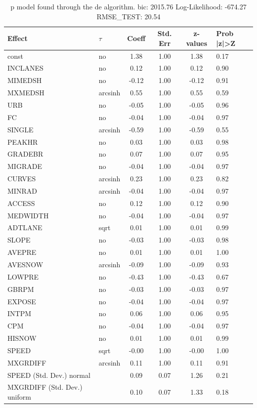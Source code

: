 \begin{table}
	\caption{p model found through the de algorithm. bic: 2015.76 Log-Likelihood: -674.27 RMSE_TEST: 20.54}
	\begin{center}
		\begin{tabular}{|l|l|c|c|c|l|}
			\hline
			Effect & $\tau$ & Coeff & Std. Err & z-values & Prob |z|>Z \\
			\hline
			const & no & 1.38 & 1.00 & 1.38 & 0.17 \\
			\hline
			INCLANES & no & 0.12 & 1.00 & 0.12 & 0.90 \\
			\hline
			MIMEDSH & no & -0.12 & 1.00 & -0.12 & 0.91 \\
			\hline
			MXMEDSH & arcsinh & 0.55 & 1.00 & 0.55 & 0.59 \\
			\hline
			URB & no & -0.05 & 1.00 & -0.05 & 0.96 \\
			\hline
			FC & no & -0.04 & 1.00 & -0.04 & 0.97 \\
			\hline
			SINGLE & arcsinh & -0.59 & 1.00 & -0.59 & 0.55 \\
			\hline
			PEAKHR & no & 0.03 & 1.00 & 0.03 & 0.98 \\
			\hline
			GRADEBR & no & 0.07 & 1.00 & 0.07 & 0.95 \\
			\hline
			MIGRADE & no & -0.04 & 1.00 & -0.04 & 0.97 \\
			\hline
			CURVES & arcsinh & 0.23 & 1.00 & 0.23 & 0.82 \\
			\hline
			MINRAD & arcsinh & -0.04 & 1.00 & -0.04 & 0.97 \\
			\hline
			ACCESS & no & 0.12 & 1.00 & 0.12 & 0.90 \\
			\hline
			MEDWIDTH & no & -0.04 & 1.00 & -0.04 & 0.97 \\
			\hline
			ADTLANE & sqrt & 0.01 & 1.00 & 0.01 & 0.99 \\
			\hline
			SLOPE & no & -0.03 & 1.00 & -0.03 & 0.98 \\
			\hline
			AVEPRE & no & 0.01 & 1.00 & 0.01 & 1.00 \\
			\hline
			AVESNOW & arcsinh & -0.09 & 1.00 & -0.09 & 0.93 \\
			\hline
			LOWPRE & no & -0.43 & 1.00 & -0.43 & 0.67 \\
			\hline
			GBRPM & no & -0.03 & 1.00 & -0.03 & 0.97 \\
			\hline
			EXPOSE & no & -0.04 & 1.00 & -0.04 & 0.97 \\
			\hline
			INTPM & no & 0.06 & 1.00 & 0.06 & 0.95 \\
			\hline
			CPM & no & -0.04 & 1.00 & -0.04 & 0.97 \\
			\hline
			HISNOW & no & 0.01 & 1.00 & 0.01 & 0.99 \\
			\hline
			SPEED & sqrt & -0.00 & 1.00 & -0.00 & 1.00 \\
			\hline
			MXGRDIFF & arcsinh & 0.11 & 1.00 & 0.11 & 0.91 \\
			\hline
			SPEED (Std. Dev.) normal &  & 0.09 & 0.07 & 1.26 & 0.21 \\
			\hline
			MXGRDIFF (Std. Dev.) uniform &  & 0.10 & 0.07 & 1.33 & 0.18 \\
			\hline
		\end{tabular}
	\end{center}
\end{table}
